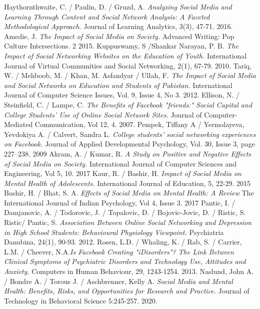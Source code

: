 \documentclass[lettersize,journal]{IEEEtran}
\begin{document}
\begin{thebibliography}{}
    Haythornthwaite, C. / Paulin, D. / Gruzd, A. {\it{Analyzing Social Media
        and Learning Through Content and Social Network Analysis: A Faceted
        Methodological Approach.}} Journal of Learning Analytics, 3(3), 47-71.
        2016.
        Amedie, J. {\it{The Impact of Social Media on Society.}}
        Advanced Writing: Pop Culture Intersections. 2
        2015.
	Kuppuswamy, S /Shankar Narayan, P. B. {\it{The Impact of Social Networking Websites on the Education of Youth.}}
	International Journal of Virtual Communities and Social Networking, 2(1), 67-79.
	2010.
	Tariq, W. / Mehboob, M. / Khan, M. Asfandyar / Ullah, F. {\it{The Impact of Social Media and Social Networks on Education and Students of Pakistan.}} International Journal of Computer Science Issues, Vol. 9, Issue 4, No 3.
	2012.
	Ellison, N. / Steinfield, C. / Lampe, C. {\it{The Benefits of Facebook "friends:" Social Capital and College Students' Use of Online Social Network Sites.}} Journal of Computer-Mediated Communication, Vol 12, 4.
	2007.
	Pempek, Tiffany A / Yermolayeva, Yevdokiya A. / Calvert, Sandra L. {\it{College students’ social networking experiences on
		Facebook.}} Journal of Applied Developmental Psychology, Vol. 30, Issue 3, page 227–238.
	2009
	Akram, A. / Kumar, R. {\it{A Study on Positive and Negative Effects of Social Media on Society.}}
	International Journal of Computer Sciences and Engineering, Vol 5, 10.
	2017
	Kaur, R. / Bashir, H. {\it{Impact of Social Media on Mental Health of Adolescents.}}
	International Journal of Education, 5, 22-29.
	2015
	Bashir, H. / Bhat, S. A. {\it{Effects of Social Media on Mental Health: A Review}}
	The International Journal of Indian Psychology, Vol 4, Issue 3.
	2017
	Pantic, I. / Damjanovic, A. / Todorovic, J. / Topalovic, D. / Bojovic-Jovic, D. / Ristic, S. Ristic/ Pantic, S.
	{\it{Association Between Online Social Networking and Depression in High School Students: Behavioural Physiology Viewpoint.}}
	Psychiatria Danubina, 24(1), 90-93.
	2012.
	Rosen, L.D. / Whaling, K. / Rab, S. / Carrier, L.M. / Cheever, N.A.{\it{Is Facebook Creating "iDisorders"? The Link Between Clinical Symptoms of Psychiatric Disorders and Technology Use, Attitudes and Anxiety.}} Computers in Human Behaviour, 29, 1243-1254.
	2013.
	Naslund, John A. / Bondre A. / Torous J. / Aschbrenner, Kelly A. {\it{Social Media and Mental Health: Benefits, Risks, and Opportunities for Research and Practice.}} Journal of Technology in Behavioral Science 5:245-257.
	2020.
\end{thebibliography}
\end{document}
